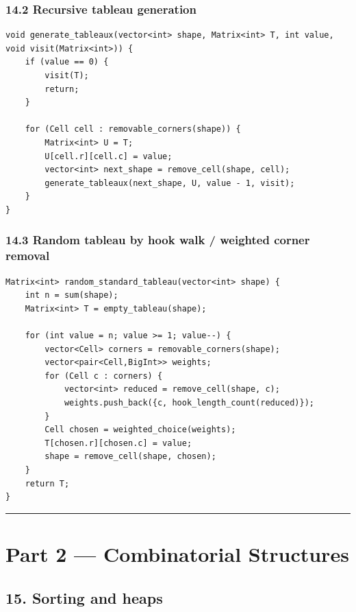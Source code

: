 \documentclass[11pt]{article}
\begin{document}
\subsubsection{14.2 Recursive tableau generation}\label{recursive-tableau-generation}

\begin{verbatim}
void generate_tableaux(vector<int> shape, Matrix<int> T, int value, void visit(Matrix<int>)) {
    if (value == 0) {
        visit(T);
        return;
    }

    for (Cell cell : removable_corners(shape)) {
        Matrix<int> U = T;
        U[cell.r][cell.c] = value;
        vector<int> next_shape = remove_cell(shape, cell);
        generate_tableaux(next_shape, U, value - 1, visit);
    }
}
\end{verbatim}

\subsubsection{14.3 Random tableau by hook walk / weighted corner removal}\label{random-tableau-by-hook-walk-weighted-corner-removal}

\begin{verbatim}
Matrix<int> random_standard_tableau(vector<int> shape) {
    int n = sum(shape);
    Matrix<int> T = empty_tableau(shape);

    for (int value = n; value >= 1; value--) {
        vector<Cell> corners = removable_corners(shape);
        vector<pair<Cell,BigInt>> weights;
        for (Cell c : corners) {
            vector<int> reduced = remove_cell(shape, c);
            weights.push_back({c, hook_length_count(reduced)});
        }
        Cell chosen = weighted_choice(weights);
        T[chosen.r][chosen.c] = value;
        shape = remove_cell(shape, chosen);
    }
    return T;
}
\end{verbatim}

\begin{center}\rule{0.5\linewidth}{0.5pt}\end{center}

\section{Part 2 --- Combinatorial Structures}\label{part-2-combinatorial-structures}

\subsection{15. Sorting and heaps}\label{sorting-and-heaps}
\end{document}
